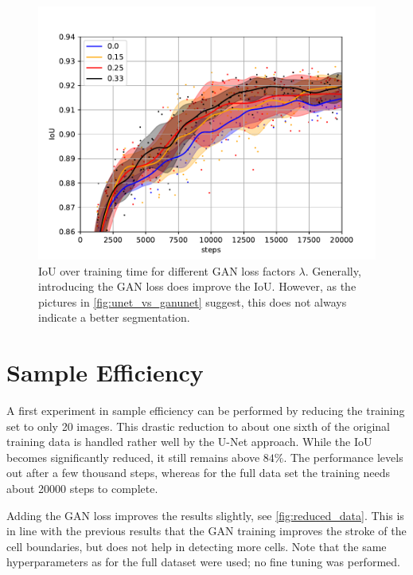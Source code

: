 \documentclass[aps,prl,twocolumn,groupedaddress,amsmath,amssymb]{revtex4-1}
\begin{document}
    \begin{figure}[tbp]
        \begin{center}
        \includegraphics[width=\linewidth]{figures/gan_4_w.pdf}
        \end{center}
        \caption{IoU over training time for different GAN loss factors $\lambda$. Generally, introducing the
        GAN loss does improve the IoU. However, as the pictures in \autoref{fig:unet_vs_ganunet} suggest, 
        this does not always indicate a better segmentation.}
        \label{fig:gan_up}
    \end{figure}


    \section{Sample Efficiency}

    A first experiment in sample efficiency can be performed by reducing the training set to only 20
    images. This drastic reduction to about one sixth of the original training data is handled
    rather well by the U-Net approach. While the IoU becomes significantly reduced, it still remains
    above $84\%$. The performance levels out after a few thousand steps, whereas for the full data
    set the training needs about 20000 steps to complete.

    Adding the GAN loss improves the results slightly, see \autoref{fig:reduced_data}. This is in
    line with the previous results that the GAN training improves the stroke of the cell boundaries,
    but does not help in detecting more cells.  Note that the same hyperparameters as for the full
    dataset were used; no fine tuning was performed.
\end{document}
